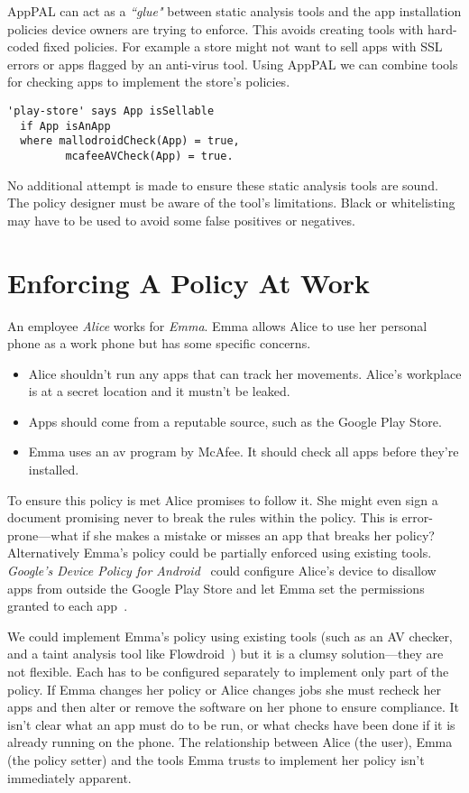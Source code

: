 \documentclass[]{llncs}
\begin{document}
AppPAL can act as a \emph{``glue"} between static analysis tools and the app installation policies device owners are trying to enforce.
This avoids creating tools with hard-coded fixed policies.
 For example a store might not want to sell apps with SSL errors or apps flagged by an anti-virus tool.
Using AppPAL we can combine tools for checking apps to implement the store's policies.
\begin{lstlisting}
'play-store' says App isSellable
  if App isAnApp
  where mallodroidCheck(App) = true,
         mcafeeAVCheck(App) = true.
\end{lstlisting}
No additional attempt is made to ensure these static analysis tools are sound.
The policy designer must be aware of the tool's limitations.
Black or whitelisting may have to be used to avoid some false positives or negatives.

\section{Enforcing A Policy At Work}
\label{sec:problem}

An employee \emph{Alice} works for \emph{Emma}.
Emma allows Alice to use her personal phone as a work phone but has some specific concerns.
\begin{itemize}
  \item Alice shouldn't run any apps that can track her movements.
    Alice's workplace is at a secret location and it mustn't be leaked.
  \item Apps should come from a reputable source, such as the Google Play Store.
  \item Emma uses an \ac{av} program by McAfee.
    It should check all apps before they're installed.
\end{itemize}

To ensure this policy is met Alice promises to follow it.
She might even sign a document promising never to break the rules within the policy.
This is error-prone---what if she makes a mistake or misses an app that breaks her policy?
Alternatively Emma's policy could be partially enforced using existing tools.
\emph{Google's Device Policy for Android}~\cite{GoogleAppsDeviceP:tz} could configure Alice's device to disallow apps from outside the Google Play Store and let Emma set the permissions granted to each app~\cite{AndroidMPermission:2015uq}.

We could implement Emma's policy using existing tools (such as an AV checker, and a taint analysis tool like Flowdroid~\cite{Arzt:2014kf,Li:2015wo}) but it is a clumsy solution---they are not flexible.
Each has to be configured separately to implement only part of the policy.
If Emma changes her policy or Alice changes jobs she must recheck her apps and then alter or remove the software on her phone to ensure compliance.
It isn't clear what an app must do to be run, or what checks have been done if it is already running on the phone.
The relationship between Alice (the user), Emma (the policy setter) and the tools Emma trusts to implement her policy isn't immediately apparent.
\end{document}
